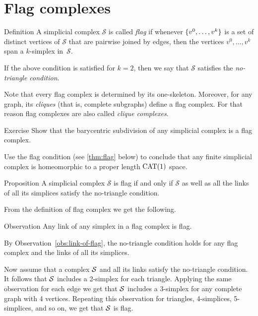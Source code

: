 \section{Flag complexes}


\begin{thm}{Definition}\label{def:flag}
A simplicial complex $\mathcal{S}$ 
is called \emph{flag} if whenever $\{v^0,\z\dots,v^k\}$
is a set of distinct vertices of $\mathcal{S}$
that are pairwise joined by edges, then the vertices $v^0,\dots,v^k$
span a $k$-simplex in~$\mathcal{S}$.

If the above condition is satisfied for $k=2$, 
then we say that $\mathcal{S}$ satisfies 
the \emph{no-triangle condition}.
\end{thm}

Note that every flag complex is determined by its one-skeleton.
Moreover, for any graph, its \emph{cliques} (that is, complete subgraphs) define a flag complex.
For that reason  flag complexes are also called  \emph{clique complexes}.

\begin{thm}{Exercise}\label{ex:baricenric-flag}
Show that the barycentric subdivision of any simplicial complex is a flag complex.

Use the flag condition (see \ref{thm:flag} below)
to conclude that any finite simplicial complex is homeomorphic to a proper length $\mathrm{CAT}(1)$ space.

\end{thm}


\begin{thm}{Proposition}\label{prop:no-trig}
A simplicial complex $\mathcal{S}$ is flag if and only if 
$\mathcal{S}$ as well as all the links of all its simplices
satisfy the no-triangle condition.
\end{thm}

From the definition of flag complex 
we get the following.

\begin{thm}{Observation}\label{obs:link-of-flag}
Any link of any simplex in a flag complex is flag.
\end{thm}


By Observation~\ref{obs:link-of-flag}, the no-triangle condition holds 
for any flag complex and the  links of all its simplices.

Now assume that a complex $\mathcal{S}$ and all its links satisfy 
the no-triangle condition.
It follows that $\mathcal{S}$ includes a 2-simplex for each triangle.
Applying the same observation for each edge we get that $\mathcal{S}$ 
includes a 3-simplex for any complete graph with 4 vertices.
Repeating this observation 
for triangles, 
4-simplices,
5-simplices,
and so on, we get that $\mathcal{S}$ is flag.
\qeds


